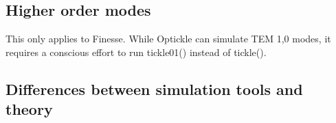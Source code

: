 \subsection{Higher order modes}
This only applies to Finesse. While Optickle can simulate TEM 1,0 modes, it requires a conscious effort to run tickle01() instead of tickle().

\subsection{Differences between simulation tools and theory}
